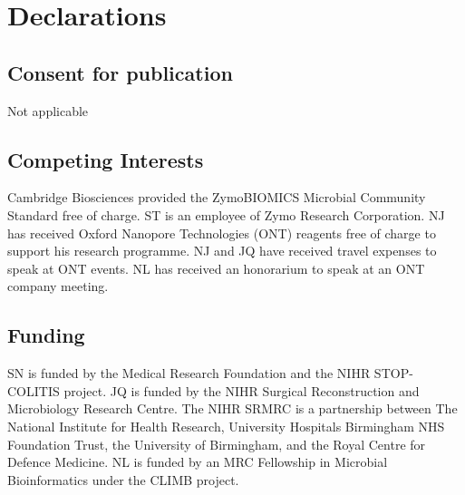 \documentclass[a4paper,num-refs]{oup-contemporary}
\begin{document}

\vfill\null
\section{Declarations}



\subsection{Consent for publication}
Not applicable

\subsection{Competing Interests}
Cambridge Biosciences provided the ZymoBIOMICS Microbial Community Standard free of charge.
ST is an employee of Zymo Research Corporation.
NJ has received Oxford Nanopore Technologies (ONT) reagents free of charge to support his research programme.
NJ and JQ have received travel expenses to speak at ONT events.
NL has received an honorarium to speak at an ONT company meeting.

\subsection{Funding}
SN is funded by the Medical Research Foundation and the NIHR STOP-COLITIS project.
JQ is funded by the NIHR Surgical Reconstruction and Microbiology Research Centre. 
The NIHR SRMRC is a partnership between The National Institute for Health Research, University Hospitals Birmingham NHS Foundation Trust, the University of Birmingham, and the Royal Centre for Defence Medicine.
NL is funded by an MRC Fellowship in Microbial Bioinformatics under the CLIMB project.
\end{document}
